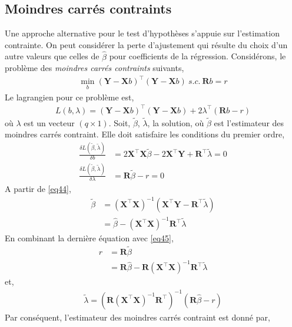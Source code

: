 \subsection{Moindres carrés contraints}
Une approche alternative pour le test d'hypothèses s'appuie sur l'estimation contrainte. On peut considérer la perte d'ajustement qui résulte du choix d'un autre valeurs que celles de $\widehat{\beta}$ pour coefficients de la régression. Considérons, le problème des \emph{moindres carrés contraints} suivants,
\begin{align*}
\min_b(\mathbf{Y}-\mathbf{X}b)^\top (\mathbf{Y}-\mathbf{X}b) \ s.c. \ \mathbf{R}b=r
\end{align*}
Le lagrangien pour ce problème est,
\begin{align*}
L(b, \lambda) = (\mathbf{Y}-\mathbf{X}b)^\top (\mathbf{Y}-\mathbf{X}b) + 2\lambda^\top(\mathbf{R}b-r)
\end{align*}
où $\lambda$ est un vecteur $(q\times 1)$. Soit, $\tilde{\beta}$, $\tilde{\lambda}$, la solution, où $\tilde{\beta}$ est l'estimateur des moindres carrés contraint. Elle doit satisfaire les conditions du premier ordre,
\begin{align}
\frac{\delta L(\tilde{\beta}, \tilde{\lambda})}{\delta b} &= 2\mathbf{X}^\top\mathbf{X}\tilde{\beta} - 2\mathbf{X}^\top\mathbf{Y} + \mathbf{R}^\top\tilde{\lambda} = 0
\label{eq44}\\
\frac{\delta L(\tilde{\beta}, \tilde{\lambda})}{\delta \lambda} &=\mathbf{R}\tilde{\beta} -r = 0
\label{eq45}
\end{align}
A partir de \eqref{eq44},
\begin{align*}
\tilde{\beta} & = (\mathbf{X}^\top\mathbf{X})^{-1}(\mathbf{X}^\top\mathbf{Y} - \mathbf{R}^\top\tilde{\lambda})\\
&=\widehat{\beta} - (\mathbf{X}^\top\mathbf{X})^{-1}\mathbf{R}^\top\tilde{\lambda}
\end{align*}
En combinant la dernière équation avec \eqref{eq45},
\begin{align*}
r &=\mathbf{R}\tilde{\beta}\\
&=\mathbf{R}\widehat{\beta} - \mathbf{R}(\mathbf{X}^\top\mathbf{X})^{-1}\mathbf{R}^\top\tilde{\lambda} 
\end{align*}
et,
\begin{align*}
\tilde{\lambda} = \left(\mathbf{R}(\mathbf{X}^\top\mathbf{X})^{-1}\mathbf{R}^\top\right)^{-1}(\mathbf{R}\widehat{\beta}-r)
\end{align*}
Par conséquent, l'estimateur des moindres carrés contraint est donné par,

